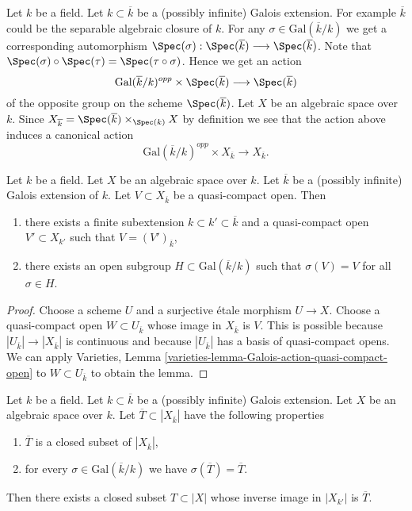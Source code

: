 \noindent
Let $k$ be a field. Let $k \subset \overline{k}$ be a (possibly infinite)
Galois extension. For example $\overline{k}$ could be the
separable algebraic closure of $k$.
For any $\sigma \in \text{Gal}(\overline{k}/k)$ we get a corresponding
automorphism
$
\Spec(\sigma) :
\Spec(\overline{k})
\longrightarrow
\Spec(\overline{k})
$.
Note that
$\Spec(\sigma) \circ \Spec(\tau) = \Spec(\tau \circ \sigma)$.
Hence we get an action
$$
\text{Gal}(\overline{k}/k)^{opp} \times \Spec(\overline{k})
\longrightarrow
\Spec(\overline{k})
$$
of the opposite group on the scheme $\Spec(\overline{k})$.
Let $X$ be an algebraic space over $k$. Since
$X_{\overline{k}} =
\Spec(\overline{k}) \times_{\Spec(k)} X$
by definition we see that the action above induces a canonical action
\begin{equation}
\label{equation-galois-action-base-change-kbar}
\text{Gal}(\overline{k}/k)^{opp} \times X_{\overline{k}}
\longrightarrow
X_{\overline{k}}.
\end{equation}

\begin{lemma}
\label{lemma-Galois-action-quasi-compact-open}
Let $k$ be a field. Let $X$ be an algebraic space over $k$.
Let $\overline{k}$ be a (possibly infinite) Galois extension of $k$.
Let $V \subset X_{\overline{k}}$ be a quasi-compact open.
Then
\begin{enumerate}
\item there exists a finite subextension $k \subset k' \subset \overline{k}$
and a quasi-compact open $V' \subset X_{k'}$ such that
$V = (V')_{\overline{k}}$,
\item there exists an open subgroup $H \subset \text{Gal}(\overline{k}/k)$
such that $\sigma(V) = V$ for all $\sigma \in H$.
\end{enumerate}
\end{lemma}

\begin{proof}
Choose a scheme $U$ and a surjective \'etale morphism $U \to X$.
Choose a quasi-compact open $W \subset U_{\overline{k}}$ whose
image in $X_{\overline{k}}$ is $V$. This is possible because
$|U_{\overline{k}}| \to |X_{\overline{k}}|$ is continuous and because
$|U_{\overline{k}}|$ has a basis of quasi-compact opens. We can apply
Varieties, Lemma
\ref{varieties-lemma-Galois-action-quasi-compact-open}
to $W \subset U_{\overline{k}}$ to obtain the lemma.
\end{proof}

\begin{lemma}
\label{lemma-closed-fixed-by-Galois}
Let $k$ be a field. Let $k \subset \overline{k}$ be a (possibly infinite)
Galois extension. Let $X$ be an algebraic space over $k$. Let
$\overline{T} \subset |X_{\overline{k}}|$ have the following properties
\begin{enumerate}
\item $\overline{T}$ is a closed subset of $|X_{\overline{k}}|$,
\item for every $\sigma \in \text{Gal}(\overline{k}/k)$
we have $\sigma(\overline{T}) = \overline{T}$.
\end{enumerate}
Then there exists a closed subset $T \subset |X|$ whose inverse image
in $|X_{k'}|$ is $\overline{T}$.
\end{lemma}


